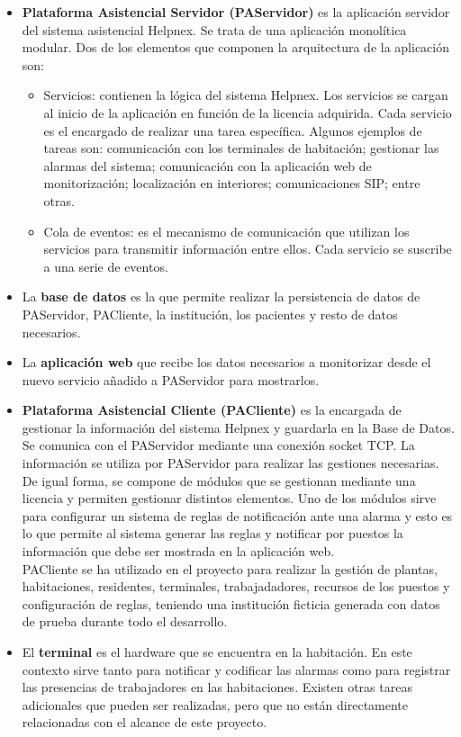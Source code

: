 \begin{itemize}
	\item \textbf{Plataforma Asistencial Servidor (PAServidor)} es la aplicación servidor del sistema asistencial Helpnex. Se trata de una aplicación monolítica modular. Dos de los elementos que componen la arquitectura de la aplicación son:
	\begin{itemize}
		\item Servicios: contienen la lógica del sistema Helpnex. Los servicios se cargan al inicio de la aplicación en función de la licencia adquirida. Cada servicio es el encargado de realizar una tarea específica. Algunos ejemplos de tareas son: comunicación con los terminales de habitación; gestionar las alarmas del sistema; comunicación con la aplicación web de monitorización; localización en interiores; comunicaciones SIP; entre otras.
		\item Cola de eventos: es el mecanismo de comunicación que utilizan los servicios para transmitir información entre ellos. Cada servicio se suscribe a una serie de eventos.
	\end{itemize}
	\item La \textbf{base de datos} es la que permite realizar la persistencia de datos de PAServidor, PACliente, la institución, los pacientes y resto de datos necesarios.
	\item La \textbf{aplicación web} que recibe los datos necesarios a monitorizar desde el nuevo servicio añadido a PAServidor para mostrarlos.
	\item \textbf{Plataforma Asistencial Cliente (PACliente)} es la encargada de gestionar la información del sistema Helpnex y guardarla en la Base de Datos. Se comunica con el PAServidor mediante una conexión socket TCP. La información se utiliza por PAServidor para realizar las gestiones necesarias. De igual forma, se compone de módulos que se gestionan mediante una licencia y permiten gestionar distintos elementos. Uno de los módulos sirve para configurar un sistema de reglas de notificación ante una alarma y esto es lo que permite al sistema generar las reglas y notificar por puestos la información que debe ser mostrada en la aplicación web.\\
	PACliente se ha utilizado en el proyecto  para realizar la gestión de plantas, habitaciones, residentes, terminales, trabajadadores, recursos de los puestos y configuración de reglas, teniendo una institución ficticia generada con datos de prueba durante todo el desarrollo.
	\item El \textbf{terminal} es el hardware que se encuentra en la habitación. En este contexto sirve tanto para notificar y codificar las alarmas como para registrar las presencias de trabajadores en las habitaciones. Existen otras tareas adicionales que pueden ser realizadas, pero que no están directamente relacionadas con el alcance de este proyecto.
\end{itemize}

